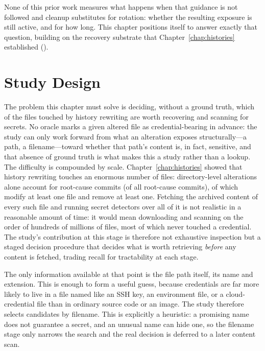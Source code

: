 None of this prior work measures what happens when that guidance is not followed and cleanup substitutes for rotation: whether the resulting exposure is still active, and for how long.
This chapter positions itself to answer exactly that question, building on the recovery substrate that Chapter~\ref{chap:histories} established ().

\section{Study Design}
\label{sec:sec-methodology}

The problem this chapter must solve is deciding, without a ground truth, which of the files touched by history rewriting are worth recovering and scanning for secrets.
No oracle marks a given altered file as credential-bearing in advance: the study can only work forward from what an alteration exposes structurally---a path, a filename---toward whether that path's content is, in fact, sensitive, and that absence of ground truth is what makes this a study rather than a lookup.
The difficulty is compounded by scale.
Chapter~\ref{chap:histories} showed that history rewriting touches an enormous number of files: directory-level alterations alone account for \DIRRootCauseCommitsShort root-cause commits (\PercentDIRRootCauseCommits of all root-cause commits), of which \CategFileModifiedShort modify at least one file and \CategFileRemovedShort remove at least one.
Fetching the archived content of every such file and running secret detectors over all of it is not realistic in a reasonable amount of time: it would mean downloading and scanning on the order of hundreds of millions of files, most of which never touched a credential.
The study's contribution at this stage is therefore not exhaustive inspection but a staged decision procedure that decides what is worth retrieving \emph{before} any content is fetched, trading recall for tractability at each stage.

The only information available at that point is the file path itself, its name and extension.
This is enough to form a useful guess, because credentials are far more likely to live in a file named like an SSH key, an environment file, or a cloud-credential file than in ordinary source code or an image.
The study therefore selects candidates by filename.
This is explicitly a heuristic: a promising name does not guarantee a secret, and an unusual name can hide one, so the filename stage only narrows the search and the real decision is deferred to a later content scan.

